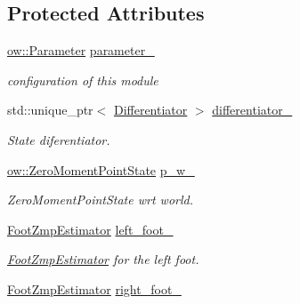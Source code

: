 \subsection*{Protected Attributes}
\begin{DoxyCompactItemize}
\item 
\hyperlink{classow_1_1Parameter}{ow\+::\+Parameter} \hyperlink{classow__zmp_1_1ZmpEstimator_ad0dd9a0e7ba0c564093e93669572fdfd}{parameter\+\_\+}\hypertarget{classow__zmp_1_1ZmpEstimator_ad0dd9a0e7ba0c564093e93669572fdfd}{}\label{classow__zmp_1_1ZmpEstimator_ad0dd9a0e7ba0c564093e93669572fdfd}

\begin{DoxyCompactList}\small\item\em configuration of this module \end{DoxyCompactList}\item 
std\+::unique\+\_\+ptr$<$ \hyperlink{classow__core_1_1StateDifferentiator}{Differentiator} $>$ \hyperlink{classow__zmp_1_1ZmpEstimator_a0c3b2def416f2fe9d502bd3b3e679320}{differentiator\+\_\+}\hypertarget{classow__zmp_1_1ZmpEstimator_a0c3b2def416f2fe9d502bd3b3e679320}{}\label{classow__zmp_1_1ZmpEstimator_a0c3b2def416f2fe9d502bd3b3e679320}

\begin{DoxyCompactList}\small\item\em State diferentiator. \end{DoxyCompactList}\item 
\hyperlink{classow__core_1_1ZeroMomentPointState}{ow\+::\+Zero\+Moment\+Point\+State} \hyperlink{classow__zmp_1_1ZmpEstimator_ae16ee85d49614015af75c8b7366833eb}{p\+\_\+w\+\_\+}\hypertarget{classow__zmp_1_1ZmpEstimator_ae16ee85d49614015af75c8b7366833eb}{}\label{classow__zmp_1_1ZmpEstimator_ae16ee85d49614015af75c8b7366833eb}

\begin{DoxyCompactList}\small\item\em Zero\+Moment\+Point\+State wrt world. \end{DoxyCompactList}\item 
\hyperlink{classow__zmp_1_1FootZmpEstimator}{Foot\+Zmp\+Estimator} \hyperlink{classow__zmp_1_1ZmpEstimator_a06d7cf83c6a8aec881cdb2ce9f313476}{left\+\_\+foot\+\_\+}\hypertarget{classow__zmp_1_1ZmpEstimator_a06d7cf83c6a8aec881cdb2ce9f313476}{}\label{classow__zmp_1_1ZmpEstimator_a06d7cf83c6a8aec881cdb2ce9f313476}

\begin{DoxyCompactList}\small\item\em \hyperlink{classow__zmp_1_1FootZmpEstimator}{Foot\+Zmp\+Estimator} for the left foot. \end{DoxyCompactList}\item 
\hyperlink{classow__zmp_1_1FootZmpEstimator}{Foot\+Zmp\+Estimator} \hyperlink{classow__zmp_1_1ZmpEstimator_a2b7c9457159d6b55f45a21d48966eac3}{right\+\_\+foot\+\_\+}\hypertarget{classow__zmp_1_1ZmpEstimator_a2b7c9457159d6b55f45a21d48966eac3}{}\label{classow__zmp_1_1ZmpEstimator_a2b7c9457159d6b55f45a21d48966eac3}


\end{DoxyCompactItemize}
